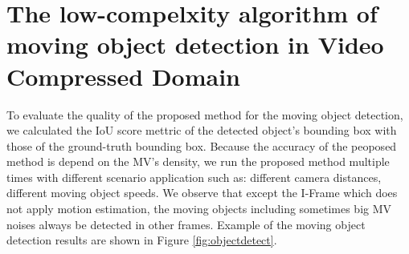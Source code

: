 \section{The low-compelxity algorithm of moving object detection in Video Compressed Domain}
To evaluate the quality of the proposed method for the moving object detection, we calculated the IoU score mettric of the detected object's bounding box with those of the ground-truth bounding box. Because the accuracy of the peoposed method is depend on the MV's density, we run the proposed method multiple times with different scenario application such as: different camera distances, different moving object speeds. We observe that except the I-Frame which does not apply motion estimation, the moving objects including sometimes big MV noises always be detected in other frames. Example of the moving object detection results  are shown in Figure \ref{fig:objectdetect}. 
